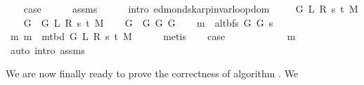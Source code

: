 \begin{isabellebody}
\ \ \isamarkupfalse%
\ {\isacharquery}{\kern0pt}case\isanewline
\ \ \ \ \isamarkupfalse%
\ assms{\isacharparenleft}{\kern0pt}{}{\isacharparenright}{\kern0pt}\isanewline
\ \ \ \ \isamarkupfalse%
\ {\isacharparenleft}{\kern0pt}intro\ edmonds{\isacharunderscore}{\kern0pt}karp{\isacharunderscore}{\kern0pt}invar{\isachardot}{\kern0pt}loop{\isacharprime}{\kern0pt}{\isacharunderscore}{\kern0pt}dom{\isacharparenright}{\kern0pt}\isanewline
{}\isamarkupfalse%
\isanewline
\ \ \isamarkupfalse%
\ {\isacharparenleft}{\kern0pt}{}\ G\ L\ R\ s\ t\ M{\isacharparenright}{\kern0pt}\isanewline
\ \ \isamarkupfalse%
\ {\isacharquery}{\kern0pt}G{}\ {\isacharequal}{\kern0pt}\ {\isachardoublequoteopen}G{}\ L\ R\ s\ t\ M{\isachardoublequoteclose}\isanewline
\ \ \isamarkupfalse%
\ {\isacharquery}{\kern0pt}G{}\ {\isacharequal}{\kern0pt}\ {\isachardoublequoteopen}G{}\ G\ {\isacharquery}{\kern0pt}G{}{\isachardoublequoteclose}\isanewline
\ \ \isamarkupfalse%
\ {\isacharquery}{\kern0pt}m\ {\isacharequal}{\kern0pt}\ {\isachardoublequoteopen}alt{\isacharunderscore}{\kern0pt}bfs\ {\isacharquery}{\kern0pt}G{}\ {\isacharquery}{\kern0pt}G{}\ s{\isachardoublequoteclose}\isanewline
\ \ \isamarkupfalse%
\ m{\isacharcolon}{\kern0pt}\ {\isachardoublequoteopen}{\isacharquery}{\kern0pt}m\ {\isacharequal}{\kern0pt}\ m{\isacharunderscore}{\kern0pt}tbd\ G\ L\ R\ s\ t\ M{\isachardoublequoteclose}\isanewline
\ \ \ \ \isamarkupfalse%
\ metis\isanewline
\ \ \isamarkupfalse%
\ {\isacharquery}{\kern0pt}case\isanewline
\ \ \ \ \isamarkupfalse%
\ {}\isanewline
\ \ \ \ \isamarkupfalse%
\ m\isanewline
\ \ \ \ \isamarkupfalse%
\ {\isacharparenleft}{\kern0pt}auto\ intro{\isacharcolon}{\kern0pt}\ assms{\isacharparenleft}{\kern0pt}{}{\isacharparenright}{\kern0pt}{\isacharparenright}{\kern0pt}\isanewline
{}\isamarkupfalse%
%
\endisatagproof
{\isafoldproof}%
%
\isadelimproof
%
\endisadelimproof
%
\isadelimdocument
%
\endisadelimdocument
%
\isatagdocument
%
\isamarkuptrue%
%
\endisatagdocument
{\isafolddocument}%
%
\isadelimdocument
%
\endisadelimdocument
%
\begin{isamarkuptext}%
We are now finally ready to prove the correctness of algorithm . We

\end{isamarkuptext}
\end{isabellebody}
